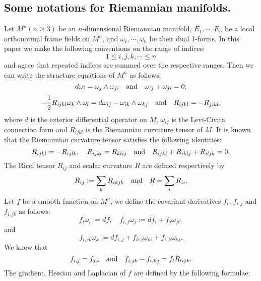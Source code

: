 \documentclass{amsart}
\theoremstyle{definition}
\theoremstyle{remark}
\numberwithin{equation}{section}
\begin{document}
\subsection{Some notations for Riemannian manifolds.}
Let $M^{n}(n \geq 3)$ be an
$n$-dimensional Riemannian manifold,
$E_{1}, \cdots, E_{n}$ be a local orthonormal frame
fields on $M^{n}$, and $\omega_{1}, \cdots, \omega_{n}$
be their dual 1-forms. In this paper we make the following
conventions on the range of indices:
\[
1\leq i,j,k,\cdots\leq n
\]
and agree that repeated indices are summed over the respective ranges. 
Then we can write the structure equations of $M^{n}$ as follows:
\begin{equation}\label{2.1}
d\omega_{i}=\omega_{j}\wedge\omega_{ji}
\quad {\rm and }\quad \omega_{ij}+\omega_{ji}=0;
\end{equation}
\begin{equation}\label{2.2}
-\frac{1}{2}R_{ijkl}\omega_{k}\wedge\omega_{l}=
d\omega_{ij}-\omega_{ik}\wedge\omega_{kj}
\quad {\rm and }\quad R_{ijkl}=-R_{jikl},
\end{equation}
where $d$ is the exterior differential operator on $M$,
$\omega_{ij}$ is the Levi-Civita connection form
and $R_{ijkl}$ is the Riemannian curvature tensor of $M$.
It is known that the Riemannian curvature tensor satisfies
the following identities:
\begin{equation}\label{2.3}
R_{ijkl}=-R_{ijlk}, \quad R_{ijkl}=R_{klij}
\quad {\rm and }\quad R_{ijkl}+R_{iklj}+R_{iljk}=0.
\end{equation}
The Ricci tensor $R_{ij}$ and scalar curvature $R$ are defined respectively by
\begin{equation}\label{2.4}
R_{ij}:=\sum\limits_{k}R_{ikjk} \quad {\rm and }\quad R=\sum\limits_{i}R_{ii}.
\end{equation}
Let $f$ be a smooth function on $M^{n}$, we define the
covariant derivatives $f_{i}$, $f_{i,j}$ and $f_{i,jk}$ as follows:
\begin{equation}\label{2.5}
f_{i}\omega_{i}:=df,\quad  f_{i,j}\omega_{j}:=df_{i}+f_{j}\omega_{ji},
\end{equation}
and
\begin{equation}\label{2.6}
f_{i,jk}\omega_{k}:=df_{i,j}+f_{k,j}\omega_{ki}+f_{i,k}\omega_{kj}.
\end{equation}
We know that
\begin{equation}\label{2.7}
f_{i,j}=f_{j,i} \quad {\rm and }\quad f_{i,jk}-f_{i,kj}=f_{l}R_{lijk}.
\end{equation}
The gradient, Hessian and Laplacian of $f$ are defined by the following formulae:
\end{document}
